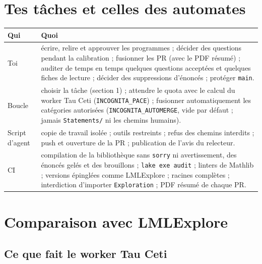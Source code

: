 \documentclass[11pt,a4paper]{article}
\newcommand{\cmd}[1]{\texttt{#1}}
\newcommand{\lmlx}{\textsf{LMLExplore}}
\begin{document}
\section{Tes tâches et celles des automates}

\begin{center}
\begin{tabularx}{\linewidth}{@{}lL@{}}
\toprule
Qui & Quoi \\
\midrule
Toi & écrire, relire et approuver les programmes ; décider des questions pendant la calibration ;
  fusionner les PR (avec le PDF résumé) ; auditer de temps en temps quelques questions acceptées et
  quelques fiches de lecture ; décider des suppressions d'énoncés ; protéger \cmd{main}. \\
\addlinespace
Boucle & choisir la tâche (section 1) ; attendre le quota avec le calcul du worker Tau Ceti
  (\cmd{INCOGNITA\_PACE}) ; fusionner automatiquement les catégories autorisées
  (\cmd{INCOGNITA\_AUTOMERGE}, vide par défaut ; jamais \cmd{Statements/} ni les chemins humains). \\
\addlinespace
Script d'agent & copie de travail isolée ; outils restreints ; refus des chemins interdits ; push et
  ouverture de la PR ; publication de l'avis du relecteur. \\
\addlinespace
CI & compilation de la bibliothèque sans \cmd{sorry} ni avertissement, des énoncés gelés et des
  brouillons ; \cmd{lake exe audit} ; linters de Mathlib ; versions épinglées comme \lmlx{} ; racines
  complètes ; interdiction d'importer \cmd{Exploration} ; PDF résumé de chaque PR. \\
\bottomrule
\end{tabularx}
\end{center}

\section{Comparaison avec \lmlx{}}

\subsection{Ce que fait le worker Tau Ceti}
\end{document}
